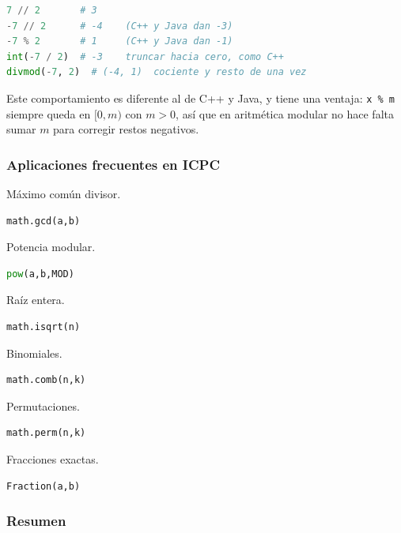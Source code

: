 \begin{lstlisting}[language=Python]
7 // 2       # 3
-7 // 2      # -4    (C++ y Java dan -3)
-7 % 2       # 1     (C++ y Java dan -1)
int(-7 / 2)  # -3    truncar hacia cero, como C++
divmod(-7, 2)  # (-4, 1)  cociente y resto de una vez
\end{lstlisting}

Este comportamiento es diferente al de C++ y Java, y tiene una ventaja: \texttt{x \%
m} siempre queda en $[0, m)$ con $m > 0$, así que en aritmética modular no hace
falta sumar $m$ para corregir restos negativos.

\vspace{0.3cm}

\subsubsection{Aplicaciones frecuentes en ICPC}

Máximo común divisor.

\begin{lstlisting}[language=Python]
math.gcd(a,b)
\end{lstlisting}

Potencia modular.

\begin{lstlisting}[language=Python]
pow(a,b,MOD)
\end{lstlisting}

Raíz entera.

\begin{lstlisting}[language=Python]
math.isqrt(n)
\end{lstlisting}

Binomiales.

\begin{lstlisting}[language=Python]
math.comb(n,k)
\end{lstlisting}

Permutaciones.

\begin{lstlisting}[language=Python]
math.perm(n,k)
\end{lstlisting}

Fracciones exactas.

\begin{lstlisting}[language=Python]
Fraction(a,b)
\end{lstlisting}

\vspace{0.3cm}

\subsubsection*{Resumen}

